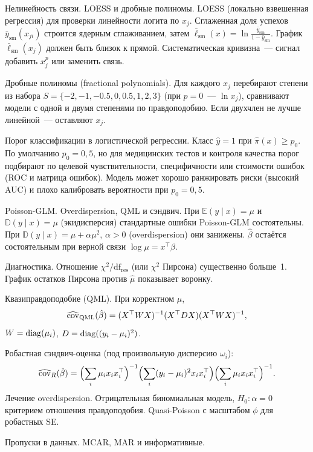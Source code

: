 Нелинейность связи. LOESS и дробные полиномы. LOESS (локально взвешенная регрессия) для проверки линейности логита по $x_j$. Сглаженная доля успехов $\bar y_{\mathrm{sm}}(x_{ji})$ строится ядерным сглаживанием, затем $\bar\ell_{\mathrm{sm}}(x)=\ln\frac{\bar y_{\mathrm{sm}}}{1-\bar y_{\mathrm{sm}}}$.
График $\bar\ell_{\mathrm{sm}}(x_j)$ должен быть близок к прямой. Систематическая кривизна~--- сигнал добавить $x_j^p$ или заменить связь.

Дробные полиномы (fractional polynomials). Для каждого $x_j$ перебирают степени из набора $S=\{-2,-1,-0.5,0,0.5,1,2,3\}$ (при $p=0$~--- $\ln x_j$), сравнивают модели с одной и двумя степенями по правдоподобию. Если двухчлен не лучше линейной~--- оставляют $x_j$.

Порог классификации в логистической регрессии. Класс $\hat y=1$ при $\hat\pi(x)\geq p_0$.
По умолчанию $p_0=0{,}5$, но для медицинских тестов и контроля качества порог подбирают по целевой чувствительности, специфичности или стоимости ошибок (ROC и матрица ошибок).
Модель может хорошо ранжировать риски (высокий AUC) и плохо калибровать вероятности при $p_0=0{,}5$.

Poisson-GLM. Overdispersion, QML и сэндвич. При $\mathbb{E}(y\mid x)=\mu$ и $\mathbb{D}(y\mid x)=\mu$ (экидисперсия) стандартные ошибки Poisson-GLM состоятельны.
При $\mathbb{D}(y\mid x)=\mu+\alpha\mu^2$, $\alpha>0$ (overdispersion) они занижены. $\hat\beta$ остаётся состоятельным при верной связи $\log\mu=x^\top\beta$.

Диагностика. Отношение $\chi^2/\mathrm{df}_{\mathrm{res}}$ (или $\chi^2$ Пирсона) существенно больше~1. График остатков Пирсона против $\hat\mu$ показывает воронку.

Квазиправдоподобие (QML). При корректном $\mu$,
\[ \widehat{\operatorname{cov}}_{\mathrm{QML}}(\hat\beta) = (X^\top W X)^{-1}(X^\top D X)(X^\top W X)^{-1}, \]
$W=\operatorname{diag}(\mu_i)$, $D=\operatorname{diag}((y_i-\mu_i)^2)$.

Робастная сэндвич-оценка (под произвольную дисперсию $\omega_i$):
\[ \widehat{\operatorname{cov}}_{R}(\hat\beta) = \Bigl(\sum_i \mu_i x_i x_i^\top\Bigr)^{-1} \Bigl(\sum_i (y_i-\mu_i)^2 x_i x_i^\top\Bigr) \Bigl(\sum_i \mu_i x_i x_i^\top\Bigr)^{-1}.
\]
Лечение overdispersion. Отрицательная биномиальная модель, $H_0\colon\alpha=0$ критерием отношения правдоподобия. Quasi-Poisson с масштабом $\phi$ для робастных SE.

Пропуски в данных. MCAR, MAR и информативные.

